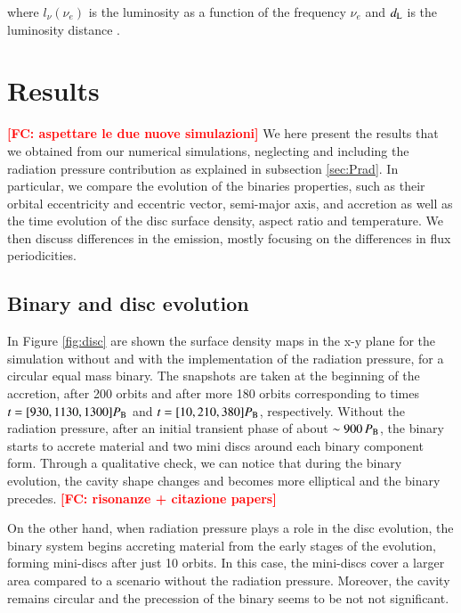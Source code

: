 \documentclass{aa}
\newcommand{\fc}[1]{\textcolor{red}{\bf [FC: #1]}}
\begin{document}
where $l_{\nu}(\nu_{e})$ is the luminosity as a function of the frequency $\nu_e$ and $d_{\rm L }$ is the luminosity distance \citep{Hogg2000, hogg2002k}.


\section{Results}
\fc{aspettare le due nuove simulazioni}
We here present the results that we obtained from our numerical simulations, neglecting and including the radiation pressure contribution as explained in subsection \ref{sec:Prad}. In particular, we compare the evolution of the binaries properties, such as their orbital eccentricity and eccentric vector, semi-major axis, and accretion as well as the time evolution of the disc surface density, aspect ratio and temperature. We then discuss differences in the emission, mostly focusing on the differences in flux periodicities. 

\label{Results}

\subsection{Binary and disc evolution}
In Figure \ref{fig:disc} are shown the surface density maps in the x-y plane for the simulation without and with the implementation of the radiation pressure, for a circular equal mass binary. The snapshots are taken at the beginning of the accretion, after 200 orbits and after more 180 orbits corresponding to times $t=[930,1130,1300] P_{\rm B}$ and $t=[10,210,380] P_{\rm B}$, respectively. 
Without the radiation pressure, after an initial transient phase of about $\sim 900 \, P_{\rm B}$, the binary starts to accrete material and two mini discs around each binary component form. Through a qualitative check, we can notice that during the binary evolution, the cavity shape changes and becomes more elliptical and the binary precedes. \fc{risonanze + citazione papers}

On the other hand, when radiation pressure plays a role in the disc evolution, the binary system begins accreting material from the early stages of the evolution, forming mini-discs after just 10 orbits. 
In this case, the mini-discs cover a larger area compared to a scenario without the radiation pressure. Moreover, the cavity remains circular and the precession of the binary seems to be not not significant.  
\end{document}
